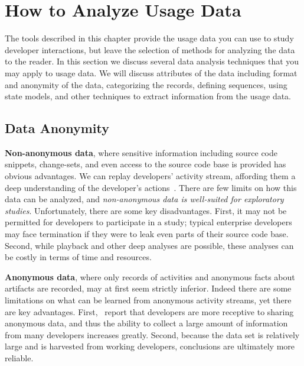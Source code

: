\section{How to Analyze Usage Data}

The tools described in this chapter provide the usage data you can use to study developer interactions, but leave the selection of methods for analyzing the data to the reader.  In this section we discuss several data analysis techniques that you may apply to usage data.  We will discuss attributes of the data including format and anonymity of the data, categorizing the records, defining sequences, using state models, and other techniques to extract information from the usage data. 

\label{sec:dataAnonymity}
\subsection{Data Anonymity}

\noindent
{\bf Non-anonymous data}, where sensitive information including source code snippets, change-sets, and even access to the source code base is provided has obvious advantages. We can replay developers' activity stream, affording them a deep understanding of the developer's actions~. There are few limits on how this data can be analyzed, and {\em non-anonymous data is well-suited for exploratory studies}. Unfortunately, there are some key disadvantages. First, it may not be permitted for developers to participate in a study; typical enterprise developers may face termination if they were to leak even parts of their source code base. Second, while playback and other deep analyses are possible, these analyses can be costly in terms of time and resources. 

\vspace{0.1in}

\noindent
{\bf Anonymous data}, where only records of activities and anonymous facts about artifacts are recorded, may at first seem strictly inferior. Indeed there are some limitations on what can be learned from anonymous activity streams, yet there are key advantages. First,~ report that developers are more receptive to sharing anonymous data, and thus the ability to collect a large amount of information from many developers increases greatly. Second, because the data set is relatively large and is harvested from working developers, conclusions are ultimately more reliable. 

